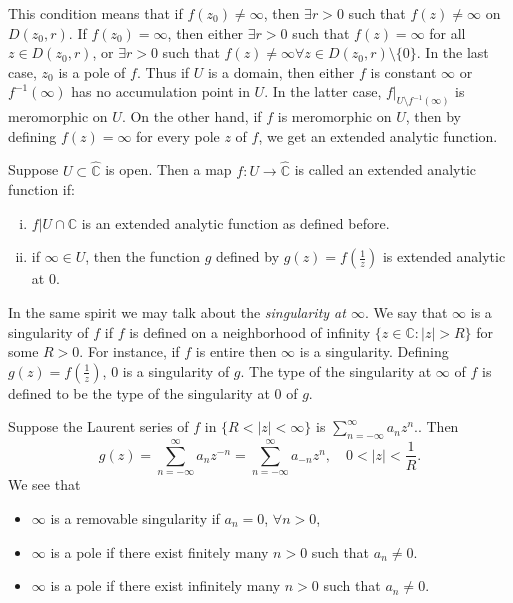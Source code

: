 This condition means that if $f(z_0) \neq \infty$, then $\exists r > 0$ such
that $f(z) \neq \infty$ on $D(z_0, r)$. If $f(z_0) = \infty$, then
either $\exists r > 0$ such that $f(z) = \infty$ for all
$z \in D(z_0, r)$, or $\exists r > 0$ such that
$f(z) \neq \infty \forall z \in D(z_0, r) \setminus \{ 0 \}$.
In the last case, $z_0$ is a pole of $f$. Thus if $U$ is a domain,
then either $f$ is constant $\infty$ or $f^{-1}(\infty)$ has no
accumulation point in $U$. In the latter case,
$f|_{U \setminus f^{-1}(\infty)}$ is meromorphic on $U$. On the other
hand, if $f$ is meromorphic on $U$, then by defining
$f(z) = \infty$ for every pole $z$ of $f$, we get an extended
analytic function.

\begin{defn}
Suppose $U \subset \hat{\mathbb{C}}$ is open. Then a map
$f : U \to \hat{\mathbb{C}}$ is called an extended analytic
function if:
\begin{enumerate}[(i)]
  \item{
    $f|{U \cap \mathbb{C}}$ is an extended analytic function
    as defined before.
  }
  \item{
    if $\infty \in U$, then the function $g$ defined by
    $g(z) = f\left(\frac{1}{z}\right)$ is extended analytic
    at 0.
  }
\end{enumerate}
In the same spirit we may talk about the
\emph{singularity at $\infty$}. We say that $\infty$ is
a singularity of $f$ if $f$ is defined on a neighborhood of infinity
$\{ z \in \mathbb{C} : |z| > R \}$ for some $R > 0$.
For instance, if $f$ is entire then $\infty$ is a
singularity. Defining $g(z) = f\left(\frac{1}{z}\right)$,
0 is a singularity of $g$. The type of the singularity at $\infty$
of $f$ is defined to be the type of the singularity at 0 of $g$.
\end{defn}

Suppose the Laurent series of $f$ in $\{ R < |z| < \infty \}$ is
$\sum_{n=-\infty}^\infty a_n z^n$.. Then
$$
  g(z)
= \sum_{n=-\infty}^\infty a_n z^{-n}
= \sum_{n=-\infty}^\infty a_{-n} z^n, \quad
  0 < |z| < \frac{1}{R}.
$$
We see that
\begin{itemize}
  \item{
    $\infty$ is a removable singularity if $a_n = 0$, $\forall n > 0$,
  }
  \item{
    $\infty$ is a pole if there exist finitely many $n > 0$ such that
    $a_n \neq 0$.
  }
  \item{
    $\infty$ is a pole if there exist infinitely many $n > 0$ such
    that $a_n \neq 0$.
  }
\end{itemize}

